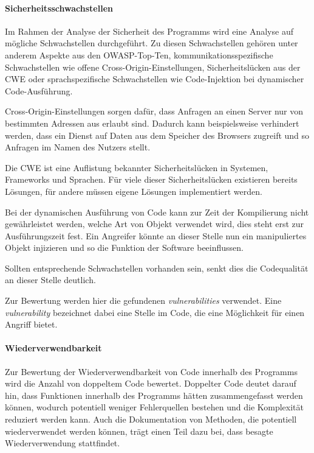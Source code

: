 \documentclass[
	oneside,  %
	ngerman, 
	final, 
	11pt, 
	a4paper, 
	1.1headlines, 
	headinclude=false, 
	footinclude=false, 
	mpinclude=false, 
	pagesize, 
	onecolumn, 
	titlepage, 
	parskip=half, 
	headsepline, 
	chapterprefix=false, 
	version=first, 
	listof=totoc, 
	bibliography=totoc, 
	toc=graduated, 
	fleqn
]{scrbook}
\begin{document}
\paragraph{Sicherheitsschwachstellen}
Im Rahmen der Analyse der Sicherheit des Programms wird eine Analyse auf mögliche Schwachstellen durchgeführt.
Zu diesen Schwachstellen gehören unter anderem Aspekte aus den \acs{OWASP}-Top-Ten, kommunikationsspezifische Schwachstellen wie offene Cross-Origin-Einstellungen, Sicherheitslücken aus der \acf{CWE} oder sprachspezifische Schwachstellen wie Code-Injektion bei dynamischer Code-Ausführung.

Cross-Origin-Einstellungen sorgen dafür, dass Anfragen an einen Server nur von bestimmten Adressen aus erlaubt sind.
Dadurch kann beispielsweise verhindert werden, dass ein Dienst auf Daten aus dem Speicher des Browsers zugreift und so Anfragen im Namen des Nutzers stellt.

Die \acs{CWE} ist eine Auflistung bekannter Sicherheitslücken in Systemen, Frameworks und Sprachen.
Für viele dieser Sicherheitslücken existieren bereits Lösungen, für andere müssen eigene Lösungen implementiert werden.

Bei der dynamischen Ausführung von Code kann zur Zeit der Kompilierung nicht gewährleistet werden, welche Art von Objekt verwendet wird, dies steht erst zur Ausführungszeit fest.
Ein Angreifer könnte an dieser Stelle nun ein manipuliertes Objekt injizieren und so die Funktion der Software beeinflussen.

Sollten entsprechende Schwachstellen vorhanden sein, senkt dies die Codequalität an dieser Stelle deutlich.

Zur Bewertung werden hier die gefundenen \textit{vulnerabilities} verwendet.
Eine \textit{vulnerability} bezeichnet dabei eine Stelle im Code, die eine Möglichkeit für einen Angriff bietet.

\paragraph{Wiederverwendbarkeit}
Zur Bewertung der Wiederverwendbarkeit von Code innerhalb des Programms wird die Anzahl von doppeltem Code bewertet.
Doppelter Code deutet darauf hin, dass Funktionen innerhalb des Programms hätten zusammengefasst werden können, wodurch potentiell weniger Fehlerquellen bestehen und die Komplexität reduziert werden kann.
Auch die Dokumentation von Methoden, die potentiell wiederverwendet werden können, trägt einen Teil dazu bei, dass besagte Wiederverwendung stattfindet.
\end{document}
